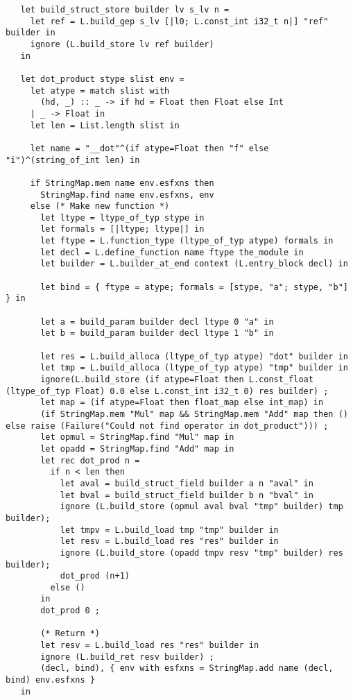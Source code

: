 \documentclass[main.tex]{subfiles}
\begin{document}
\begin{lstlisting}
   let build_struct_store builder lv s_lv n = 
     let ref = L.build_gep s_lv [|l0; L.const_int i32_t n|] "ref" builder in
     ignore (L.build_store lv ref builder)
   in

   let dot_product stype slist env =
     let atype = match slist with
       (hd, _) :: _ -> if hd = Float then Float else Int
     | _ -> Float in
     let len = List.length slist in
     
     let name = "__dot"^(if atype=Float then "f" else "i")^(string_of_int len) in

     if StringMap.mem name env.esfxns then
       StringMap.find name env.esfxns, env
     else (* Make new function *)
       let ltype = ltype_of_typ stype in
       let formals = [|ltype; ltype|] in
       let ftype = L.function_type (ltype_of_typ atype) formals in
       let decl = L.define_function name ftype the_module in
       let builder = L.builder_at_end context (L.entry_block decl) in

       let bind = { ftype = atype; formals = [stype, "a"; stype, "b"] } in

       let a = build_param builder decl ltype 0 "a" in
       let b = build_param builder decl ltype 1 "b" in

       let res = L.build_alloca (ltype_of_typ atype) "dot" builder in
       let tmp = L.build_alloca (ltype_of_typ atype) "tmp" builder in
       ignore(L.build_store (if atype=Float then L.const_float (ltype_of_typ Float) 0.0 else L.const_int i32_t 0) res builder) ;
       let map = (if atype=Float then float_map else int_map) in
       (if StringMap.mem "Mul" map && StringMap.mem "Add" map then () else raise (Failure("Could not find operator in dot_product"))) ;
       let opmul = StringMap.find "Mul" map in
       let opadd = StringMap.find "Add" map in
       let rec dot_prod n = 
         if n < len then 
           let aval = build_struct_field builder a n "aval" in
           let bval = build_struct_field builder b n "bval" in
           ignore (L.build_store (opmul aval bval "tmp" builder) tmp builder);
           let tmpv = L.build_load tmp "tmp" builder in
           let resv = L.build_load res "res" builder in
           ignore (L.build_store (opadd tmpv resv "tmp" builder) res builder);
           dot_prod (n+1)
         else ()
       in
       dot_prod 0 ;

       (* Return *)
       let resv = L.build_load res "res" builder in
       ignore (L.build_ret resv builder) ;
       (decl, bind), { env with esfxns = StringMap.add name (decl, bind) env.esfxns }
   in


\end{lstlisting}
\end{document}
